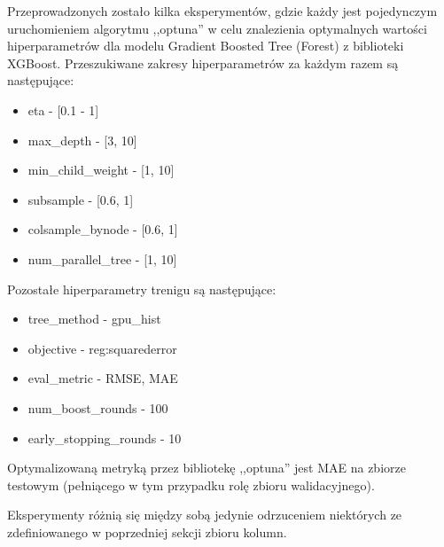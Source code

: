 \documentclass{classrep}
\begin{document}
{{{                Przeprowadzonych zostało kilka eksperymentów, gdzie każdy jest pojedynczym uruchomieniem algorytmu ,,optuna'' w celu znalezienia optymalnych wartości hiperparametrów dla modelu Gradient Boosted Tree (Forest) z biblioteki XGBoost. Przeszukiwane zakresy hiperparametrów za każdym razem są następujące:
                \begin{itemize}
                    \item eta - [0.1 - 1]
                    \item max\_depth - [3, 10]
                    \item min\_child\_weight - [1, 10]
                    \item subsample - [0.6, 1]
                    \item colsample\_bynode - [0.6, 1]
                    \item num\_parallel\_tree - [1, 10]
                \end{itemize}
                Pozostałe hiperparametry trenigu są następujące:
                \begin{itemize}
                    \item tree\_method - gpu\_hist
                    \item objective - reg:squarederror
                    \item eval\_metric - RMSE, MAE
                    \item num\_boost\_rounds - 100
                    \item early\_stopping\_rounds - 10
                \end{itemize}
                Optymalizowaną metryką przez bibliotekę ,,optuna'' jest MAE na zbiorze testowym (pełniącego w tym przypadku rolę zbioru walidacyjnego).
                
                Eksperymenty różnią się między sobą jedynie odrzuceniem niektórych ze zdefiniowanego w poprzedniej sekcji zbioru kolumn.
                
}}}
\end{document}
